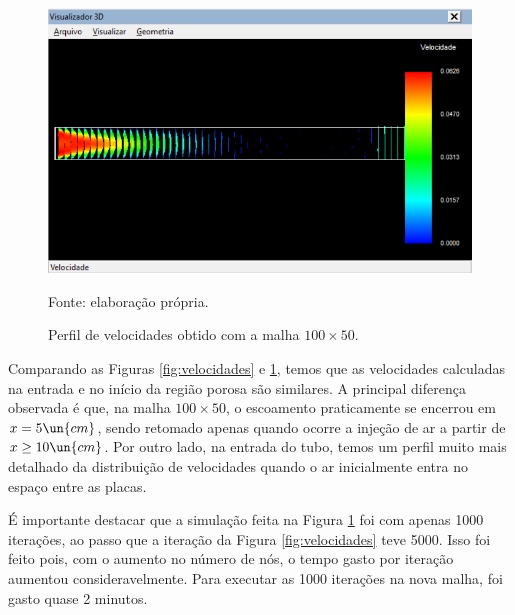 \begin{figure}[h!]
    \caption{Perfil de velocidades obtido com a malha $100 \times 50$.}
    \label{fig:velocidadeFina}
    \centering
    \centerline{\includegraphics[scale=0.5]{velocidadeFina.png}}
    \par{Fonte: elaboração própria.}
\end{figure}

Comparando as Figuras  \ref*{fig:velocidades} e \ref*{fig:velocidadeFina}, temos que as velocidades
calculadas na entrada e no início da região porosa são similares. A principal diferença observada
é que, na malha $100 \times 50$, o escoamento praticamente se encerrou em $x = 5 \un{cm}$, sendo retomado
apenas quando ocorre a injeção de ar a partir de $x \geq 10 \un{cm}$. Por outro lado,
na entrada do tubo, temos um perfil muito mais detalhado da distribuição de velocidades quando o ar
inicialmente entra no espaço entre as placas.

É importante destacar que a simulação feita na Figura \ref*{fig:velocidadeFina} foi com apenas 1000 iterações,
ao passo que a iteração da Figura  \ref*{fig:velocidades} teve 5000. Isso foi feito pois, com o aumento no número 
de nós, o tempo gasto por iteração aumentou consideravelmente. Para executar as 1000 iterações na nova malha, foi gasto quase
2 minutos.



